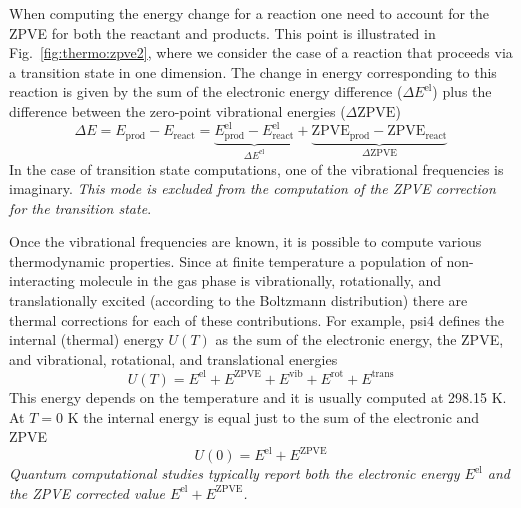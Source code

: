\documentclass[../Main/notes.tex]{subfiles}
\begin{document}

When computing the energy change for a reaction one need to account for the ZPVE for both the reactant and products.
This point is illustrated in Fig.~\ref{fig:thermo:zpve2}, where we consider the case of a reaction that proceeds via a transition state in one dimension.
The change in energy corresponding to this reaction is given by the sum of the electronic energy difference ($\Delta E^\text{el}$) plus the difference between the zero-point vibrational energies ($\Delta \text{ZPVE}$)
\begin{equation}
\Delta E = E_\text{prod} - E_\text{react} = 
\underbrace{E^\text{el}_\text{prod} - E^\text{el}_\text{react}}_{\Delta E^\text{el}}
+ \underbrace{\text{ZPVE}_\text{prod} - \text{ZPVE}_\text{react}}_{\Delta \text{ZPVE}}
\end{equation}
In the case of transition state computations, one of the vibrational frequencies is imaginary. \emph{This mode is excluded from the computation of the ZPVE correction for the transition state}.

Once the vibrational frequencies are known, it is possible to compute various thermodynamic properties.
Since at finite temperature a population of non-interacting molecule in the gas phase is vibrationally, rotationally, and translationally excited (according to the Boltzmann distribution) there are thermal corrections for each of these contributions.
For example, psi4 defines the internal (thermal) energy $U(T)$ as the sum of the electronic energy, the ZPVE, and vibrational, rotational, and translational energies
\begin{equation}
U(T) = E^{\mathrm{el}} + E^{\mathrm{ZPVE}}
+ E^{\mathrm{vib}} + E^{\mathrm{rot}} + E^{\mathrm{trans}}
\end{equation}
This energy depends on the temperature and it is usually computed at 298.15 K.
At $T  = 0 $ K the internal energy is equal just to the sum of the electronic and ZPVE
\begin{equation}
U(0) = E^{\mathrm{el}} + E^{\mathrm{ZPVE}}
\end{equation}
\emph{Quantum computational studies typically report both the electronic energy $ E^{\mathrm{el}}$ and the ZPVE corrected value $E^{\mathrm{el}} + E^{\mathrm{ZPVE}}$.}
\end{document}
